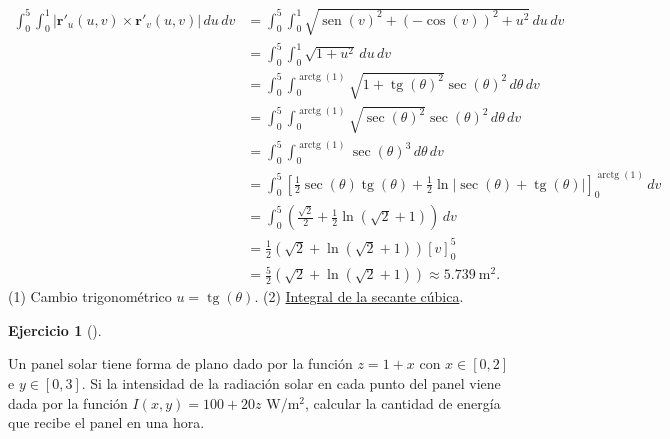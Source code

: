 \documentclass[
  spanish,
  a4paper,
]{scrreport}
\theoremstyle{definition}
\newtheorem{exercise}{Ejercicio}[chapter]
\theoremstyle{remark}
\begin{document}
\begin{tcolorbox}
\begin{align*}
\int_0^5 \int_0^1 |\mathbf{r}'_u(u,v) \times \mathbf{r}'_v(u,v)|\,du\,dv 
&= \int_0^5 \int_0^1 \sqrt{\operatorname{sen}(v)^2 + (-\cos(v))^2 + u^2}\,du\,dv \\
&= \int_0^5 \int_0^1 \sqrt{1 + u^2}\,du\,dv \\
&= \int_0^5 \int_0^{\operatorname{arctg}(1)} \sqrt{1 + \operatorname{tg}(\theta)^2}\sec(\theta)^2\,d\theta\,dv \tag{1} \\
&= \int_0^5 \int_0^{\operatorname{arctg}(1)} \sqrt{\sec(\theta)^2}\sec(\theta)^2\,d\theta\,dv \tag{2} \\
&= \int_0^5 \int_0^{\operatorname{arctg}(1)} \sec(\theta)^3\,d\theta\,dv \\
&= \int_0^5 \left[\frac{1}{2}\sec(\theta)\operatorname{tg}(\theta) + \frac{1}{2} \ln|\sec(\theta)+\operatorname{tg}(\theta)|\right]_0^{\operatorname{arctg}(1)}\,dv \\
&= \int_0^5 \left(\frac{\sqrt{2}}{2} + \frac{1}{2}\ln(\sqrt{2}+1)\right)\,dv \\
&= \frac{1}{2}\left(\sqrt{2} + \ln(\sqrt{2}+1)\right)[v]_0^5 \\
&= \frac{5}{2}\left(\sqrt{2} + \ln(\sqrt{2}+1)\right)
\approx 5.739\ \text{m}^2.
\end{align*} (1) Cambio trigonométrico \(u=\operatorname{tg}(\theta)\).
(2)
\href{https://es.wikipedia.org/wiki/Integral_de_la_secante_c\%C3\%BAbica}{Integral
de la secante cúbica}.

\end{tcolorbox}

\begin{exercise}[]\protect\hypertarget{exr-energia-panel-solar}{}\label{exr-energia-panel-solar}

Un panel solar tiene forma de plano dado por la función \(z = 1 + x\)
con \(x\in[0,2]\) e \(y\in[0,3]\). Si la intensidad de la radiación
solar en cada punto del panel viene dada por la función
\(I(x,y) = 100 + 20z\) W/m\(^2\), calcular la cantidad de energía que
recibe el panel en una hora.

\end{exercise}
\end{document}
